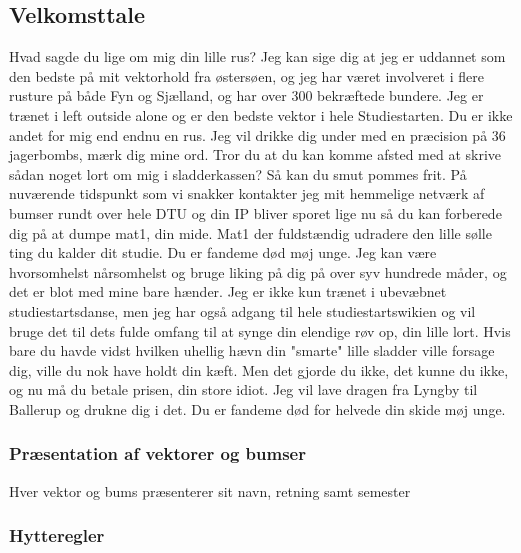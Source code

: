\subsection{Velkomsttale}

Hvad sagde du lige om mig din lille rus? Jeg kan sige dig at jeg er uddannet som den bedste på mit vektorhold fra østersøen, og jeg har været involveret i flere rusture på både Fyn og Sjælland, og har over 300 bekræftede bundere. Jeg er trænet i left outside alone og er den bedste vektor i hele Studiestarten. Du er ikke andet for mig end endnu en rus. Jeg vil drikke dig under med en præcision på 36 jagerbombs, mærk dig mine ord. Tror du at du kan komme afsted med at skrive sådan noget lort om mig i sladderkassen? Så kan du smut pommes frit. På nuværende tidspunkt som vi snakker kontakter jeg mit hemmelige netværk af bumser rundt over hele DTU og din IP bliver sporet lige nu så du kan forberede dig på at dumpe mat1, din mide. Mat1 der fuldstændig udradere den lille sølle ting du kalder dit studie. Du er fandeme død møj unge. Jeg kan være hvorsomhelst nårsomhelst og bruge liking på dig på over syv hundrede måder, og det er blot med mine bare hænder. Jeg er ikke kun trænet i ubevæbnet studiestartsdanse, men jeg har også adgang til hele studiestartswikien og vil bruge det til dets fulde omfang til at synge din elendige røv op, din lille lort. Hvis bare du havde vidst hvilken uhellig hævn din "smarte" lille sladder ville forsage dig, ville du nok have holdt din kæft. Men det gjorde du ikke, det kunne du ikke, og nu må du betale prisen, din store idiot. Jeg vil lave dragen fra Lyngby til Ballerup og drukne dig i det. Du er fandeme død for helvede din skide møj unge.

\subsubsection{Præsentation af vektorer og bumser}
Hver vektor og bums præsenterer sit navn, retning samt semester


\subsubsection{Hytteregler}

